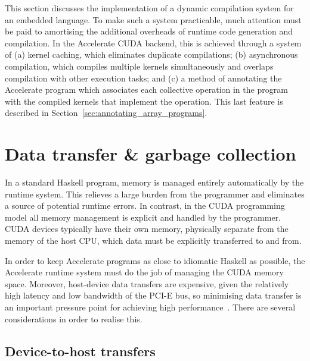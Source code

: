 This section discusses the implementation of a dynamic compilation system for an
embedded language. To make such a system practicable, much attention must be
paid to amortising the additional overheads of runtime code generation and
compilation. In the Accelerate CUDA backend, this is achieved through a system
of (a) kernel caching, which eliminates duplicate compilations; (b) asynchronous
compilation, which compiles multiple kernels simultaneously and overlaps
compilation with other execution tasks; and (c) a method of annotating the
Accelerate program which associates each collective operation in the program
with the compiled kernels that implement the operation. This last feature is
described in Section~\ref{sec:annotating_array_programs}.


\section{Data transfer \& garbage collection}
\label{sec:memory_management}

In a standard Haskell program, memory is managed entirely automatically by the
runtime system. This relieves a large burden from the programmer and eliminates
a source of potential runtime errors. In contrast, in the CUDA programming model
all memory management is explicit and handled by the programmer. CUDA devices
typically have their own memory, physically separate from the memory of the host
CPU, which data must be explicitly transferred to and from.

In order to keep Accelerate programs as close to idiomatic Haskell as possible,
the Accelerate runtime system must do the job of managing the CUDA memory
space. Moreover, host-device data transfers are expensive, given the relatively
high latency and low bandwidth of the PCI-E bus, so minimising data transfer is
an important pressure point for achieving high performance~\cite{NVIDIA:2012wf}.
There are several considerations in order to realise this.



\subsection{Device-to-host transfers}

